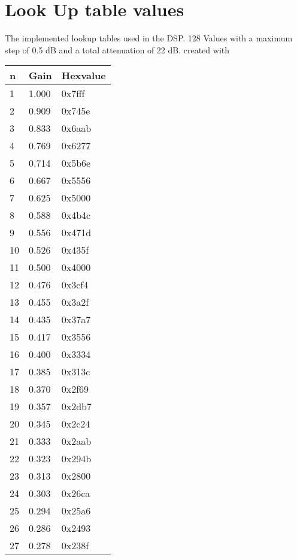 \chapter{Look Up table values}\label{app:LookupTables}
\vspace{-0.75cm}
The implemented lookup tables used in the DSP. 128 Values with a maximum step of 0.5 dB and a total attenuation of 22 dB. created with 
\vspace{-0.25cm}
\renewcommand{\arraystretch}{0.85}
\begin{table}[H]
\centering
\begin{subtable}[t]{0.30\linewidth}
\centering
\vspace{0pt}
\begin{tabular}{lll}
  \toprule
n & Gain & Hexvalue \\
  \midrule
1 & 1.000 & 0x7fff \\ 
2 & 0.909 & 0x745e \\ 
3 & 0.833 & 0x6aab \\ 
4 & 0.769 & 0x6277 \\ 
5 & 0.714 & 0x5b6e \\ 
6 & 0.667 & 0x5556 \\ 
7 & 0.625 & 0x5000 \\ 
8 & 0.588 & 0x4b4c \\ 
9 & 0.556 & 0x471d \\ 
10 & 0.526 & 0x435f \\ 
11 & 0.500 & 0x4000 \\ 
12 & 0.476 & 0x3cf4 \\ 
13 & 0.455 & 0x3a2f \\ 
14 & 0.435 & 0x37a7 \\ 
15 & 0.417 & 0x3556 \\ 
16 & 0.400 & 0x3334 \\ 
17 & 0.385 & 0x313c \\ 
18 & 0.370 & 0x2f69 \\ 
19 & 0.357 & 0x2db7 \\ 
20 & 0.345 & 0x2c24 \\ 
21 & 0.333 & 0x2aab \\ 
22 & 0.323 & 0x294b \\ 
23 & 0.313 & 0x2800 \\ 
24 & 0.303 & 0x26ca \\ 
25 & 0.294 & 0x25a6 \\ 
26 & 0.286 & 0x2493 \\ 
27 & 0.278 & 0x238f \\ 

\end{tabular}
\end{subtable}
\end{table}
